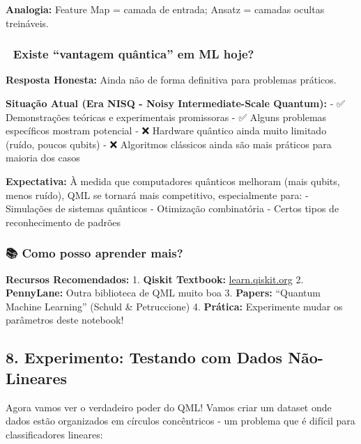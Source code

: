 \documentclass[
  brazilian,
]{report}
\begin{document}
\textbf{Analogia:} Feature Map = camada de entrada; Ansatz = camadas
ocultas treináveis.

\subsubsection{🚀 Existe ``vantagem quântica'' em ML
hoje?}\label{existe-vantagem-quuxe2ntica-em-ml-hoje}

\textbf{Resposta Honesta:} Ainda não de forma definitiva para problemas
práticos.

\textbf{Situação Atual (Era NISQ - Noisy Intermediate-Scale Quantum):} -
✅ Demonstrações teóricas e experimentais promissoras - ✅ Alguns
problemas específicos mostram potencial - ❌ Hardware quântico ainda
muito limitado (ruído, poucos qubits) - ❌ Algoritmos clássicos ainda
são mais práticos para maioria dos casos

\textbf{Expectativa:} À medida que computadores quânticos melhoram (mais
qubits, menos ruído), QML se tornará mais competitivo, especialmente
para: - Simulações de sistemas quânticos - Otimização combinatória -
Certos tipos de reconhecimento de padrões

\subsubsection{📚 Como posso aprender
mais?}\label{como-posso-aprender-mais}

\textbf{Recursos Recomendados:} 1. \textbf{Qiskit Textbook:}
\href{https://learn.qiskit.org}{learn.qiskit.org} 2. \textbf{PennyLane:}
Outra biblioteca de QML muito boa 3. \textbf{Papers:} ``Quantum Machine
Learning'' (Schuld \& Petruccione) 4. \textbf{Prática:} Experimente
mudar os parâmetros deste notebook!

\subsection{8. Experimento: Testando com Dados
Não-Lineares}\label{experimento-testando-com-dados-nuxe3o-lineares}

Agora vamos ver o verdadeiro poder do QML! Vamos criar um dataset onde
dados estão organizados em círculos concêntricos - um problema que é
difícil para classificadores lineares:
\end{document}
